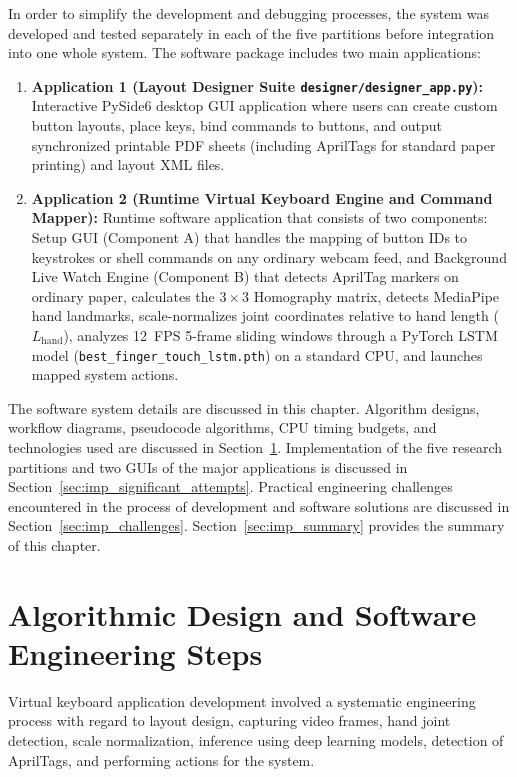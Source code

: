 In order to simplify the development and debugging processes, the system was developed and tested separately in each of the five partitions before integration into one whole system. The software package includes two main applications:
\begin{enumerate}
    \item \textbf{Application 1 (Layout Designer Suite \texttt{designer/designer\_app.py}):} Interactive PySide6 desktop GUI application where users can create custom button layouts, place keys, bind commands to buttons, and output synchronized printable PDF sheets (including AprilTags for standard paper printing) and layout XML files.
    \item \textbf{Application 2 (Runtime Virtual Keyboard Engine and Command Mapper):} Runtime software application that consists of two components: Setup GUI (Component A) that handles the mapping of button IDs to keystrokes or shell commands on any ordinary webcam feed, and Background Live Watch Engine (Component B) that detects AprilTag markers on ordinary paper, calculates the $3 \times 3$ Homography matrix, detects MediaPipe hand landmarks, scale-normalizes joint coordinates relative to hand length ($L_{\text{hand}}$), analyzes 12~FPS 5-frame sliding windows through a PyTorch LSTM model (\texttt{best\_finger\_touch\_lstm.pth}) on a standard CPU, and launches mapped system actions.
\end{enumerate}

The software system details are discussed in this chapter. Algorithm designs, workflow diagrams, pseudocode algorithms, CPU timing budgets, and technologies used are discussed in Section~\ref{sec:imp_framework_steps}. Implementation of the five research partitions and two GUIs of the major applications is discussed in Section~\ref{sec:imp_significant_attempts}. Practical engineering challenges encountered in the process of development and software solutions are discussed in Section~\ref{sec:imp_challenges}. Section~\ref{sec:imp_summary} provides the summary of this chapter.

\section{Algorithmic Design and Software Engineering Steps}
\label{sec:imp_framework_steps}
Virtual keyboard application development involved a systematic engineering process with regard to layout design, capturing video frames, hand joint detection, scale normalization, inference using deep learning models, detection of AprilTags, and performing actions for the system.

